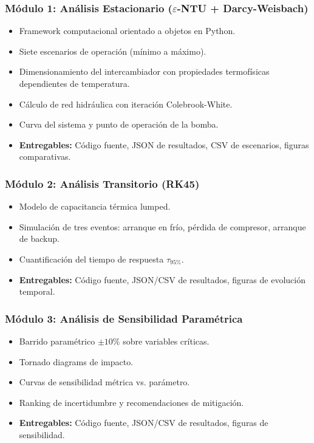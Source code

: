 \documentclass[11pt,a4paper]{article}
\begin{document}
\subsubsection{Módulo 1: Análisis Estacionario ($\varepsilon$-NTU + Darcy-Weisbach)}

\begin{itemize}
  \item Framework computacional orientado a objetos en Python.
  \item Siete escenarios de operación (mínimo a máximo).
  \item Dimensionamiento del intercambiador con propiedades termofísicas dependientes de temperatura.
  \item Cálculo de red hidráulica con iteración Colebrook-White.
  \item Curva del sistema y punto de operación de la bomba.
  \item \textbf{Entregables:} Código fuente, JSON de resultados, CSV de escenarios, figuras comparativas.
\end{itemize}

\subsubsection{Módulo 2: Análisis Transitorio (RK45)}

\begin{itemize}
  \item Modelo de capacitancia térmica lumped.
  \item Simulación de tres eventos: arranque en frío, pérdida de compresor, arranque de backup.
  \item Cuantificación del tiempo de respuesta $\tau_{95\%}$.
  \item \textbf{Entregables:} Código fuente, JSON/CSV de resultados, figuras de evolución temporal.
\end{itemize}

\subsubsection{Módulo 3: Análisis de Sensibilidad Paramétrica}

\begin{itemize}
  \item Barrido paramétrico $\pm 10\%$ sobre variables críticas.
  \item Tornado diagrams de impacto.
  \item Curvas de sensibilidad métrica vs. parámetro.
  \item Ranking de incertidumbre y recomendaciones de mitigación.
  \item \textbf{Entregables:} Código fuente, JSON/CSV de resultados, figuras de sensibilidad.
\end{itemize}
\end{document}
